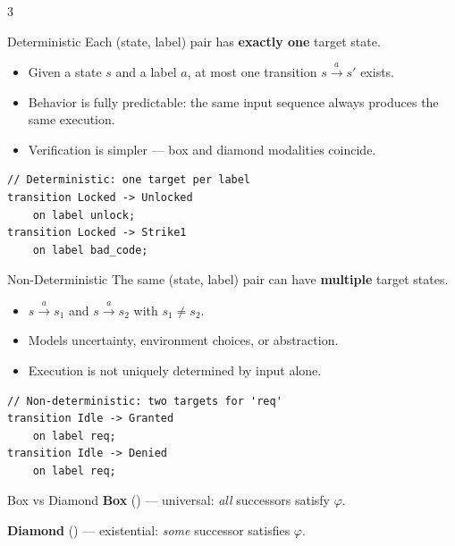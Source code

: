 



\begin{multicols}{3}
\footnotesize


\begin{cheatbox}{Deterministic}
Each (state, label) pair has \textbf{exactly one} target state.
\begin{itemize}
  \item Given a state $s$ and a label $a$, at most one transition $s \xrightarrow{a} s'$ exists.
  \item Behavior is fully predictable: the same input sequence always produces the same execution.
  \item Verification is simpler --- box and diamond modalities coincide.
\end{itemize}
\begin{lstlisting}[style=ctxdsl]
// Deterministic: one target per label
transition Locked -> Unlocked
    on label unlock;
transition Locked -> Strike1
    on label bad_code;
\end{lstlisting}
\end{cheatbox}

\begin{cheatbox}{Non-Deterministic}
The same (state, label) pair can have \textbf{multiple} target states.
\begin{itemize}
  \item $s \xrightarrow{a} s_1$ and $s \xrightarrow{a} s_2$ with $s_1 \neq s_2$.
  \item Models uncertainty, environment choices, or abstraction.
  \item Execution is not uniquely determined by input alone.
\end{itemize}
\begin{lstlisting}[style=ctxdsl]
// Non-deterministic: two targets for 'req'
transition Idle -> Granted
    on label req;
transition Idle -> Denied
    on label req;
\end{lstlisting}
\end{cheatbox}


\begin{cheatbox}{Box vs Diamond}
\textbf{Box} () --- universal: \emph{all} successors satisfy $\varphi$.

\textbf{Diamond} () --- existential: \emph{some} successor satisfies $\varphi$.


\end{cheatbox}
\end{multicols}
